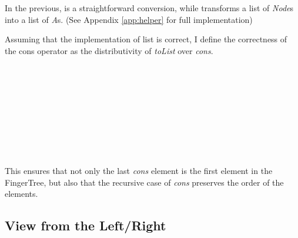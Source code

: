 \documentclass[12pt,twoside,notitlepage]{report}
\begin{document}
In the previous,  is a straightforward conversion, while  transforms a list of \textit{Node}s into a list of \textit{A}s. (See Appendix \ref{app:helper} for full implementation)

Assuming that the implementation of list is correct, I define the correctness of the cons operator as the distributivity of \textit{toList} over \textit{cons}.

\begin{code}
\\
\> \AgdaSymbol{:}  \AgdaSymbol{\{}\AgdaSymbol{\}\{} \AgdaSymbol{:}  \AgdaSymbol{\}\{} \AgdaSymbol{:}   \AgdaSymbol{\}}\<%
\\
\>[6]\<[8]%
\>[8]  \AgdaSymbol{:}   \<%
\\
\>[6]\<[8]%
\>[8]  \AgdaSymbol{:}    \<%
\\
\>[6]\<[8]%
\>[8]\AgdaSymbol{\{} \AgdaSymbol{:} \AgdaSymbol{\}} \<%
\\
\>[6]\<[8]%
\>[8]\AgdaSymbol{(} \AgdaSymbol{:} \AgdaSymbol{)} \<%
\\
\>[6]\<[8]%
\>[8]\AgdaSymbol{(} \AgdaSymbol{:}    \AgdaSymbol{\{}\AgdaSymbol{\})} \<%
\\
\>[6]\<[8]%
\>[8] \AgdaSymbol{(}  \AgdaSymbol{)}  \AgdaSymbol{(}  \AgdaInductiveConstructor{[]}\AgdaSymbol{)} \AgdaFunction{++} \AgdaSymbol{(} \AgdaSymbol{)}\<%
\\
\end{code} 

This ensures that not only the last \textit{cons} element is the first element in the FingerTree, but also that the recursive case of \textit{cons} preserves the order of the elements.


\subsection{View from the Left/Right}
\end{document}
